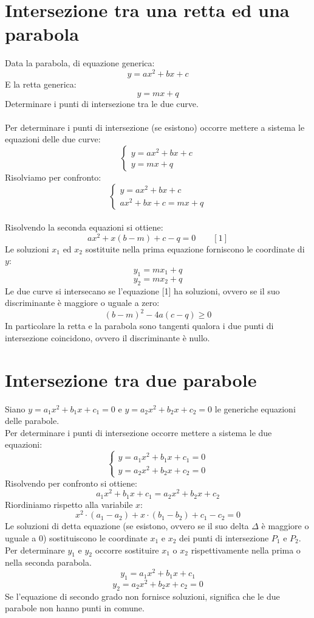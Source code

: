 \documentclass[12pt]{book}
\begin{document}
			\section{Intersezione tra una retta ed una parabola}
			Data la parabola, di equazione generica:
			\[y=ax^2+bx+c\]
			E la retta generica:
			\[y=mx+q\]
			Determinare i punti di intersezione tra le due curve.\\
			\\Per determinare i punti di intersezione (se esistono) occorre mettere a sistema le equazioni delle due curve:
			\[\begin{cases}
				y=ax^2+bx+c\\
				y=mx+q
			\end{cases}\]
			Risolviamo per confronto:
			\[\begin{cases}
				y=ax^2+bx+c\\
				ax^2+bx+c=mx+q
			\end{cases}\]
			\\Risolvendo la seconda equazioni si ottiene:
			\[ax^2+x(b-m)+c-q=0\quad\quad [1] \]
			Le soluzioni $x_1$ ed $x_2$ sostituite nella prima equazione forniscono le coordinate di $y$:
			\[y_1=mx_1+q\]
			\[y_2=mx_2+q\]
			Le due curve si intersecano se l'equazione [1] ha soluzioni, ovvero se il suo discriminante è maggiore o uguale a zero:
			\[(b-m)^2-4a(c-q)\geq0\]
			In particolare la retta e la parabola sono tangenti qualora i due punti di intersezione coincidono, ovvero il discriminante è nullo.
			
			\section{Intersezione tra due parabole}
			Siano $y=a_1x^2+b_1x+c_1=0$ e $y=a_2x^2+b_2x+c_2=0$ le generiche equazioni delle parabole.
			\\Per determinare i punti di intersezione occorre mettere a sistema le due equazioni:
				\[\begin{cases}
					y=a_1x^2+b_1x+c_1=0\\
					y=a_2x^2+b_2x+c_2=0
				\end{cases}\]
			Risolvendo per confronto si ottiene:
			\[a_1x^2+b_1x+c_1=a_2x^2+b_2x+c_2\]
			Riordiniamo rispetto alla variabile $x$:
			\[x^2\cdot \left(a_1-a_2\right)+x\cdot \left(b_1-b_2\right)+c_1-c_2=0\]
			Le soluzioni di detta equazione (se esistono, ovvero se il suo delta $\Delta$ è maggiore o uguale a 0) sostituiscono le coordinate $x_1$ e $x_2$ dei punti di intersezione $P_1$ e $P_2$. Per determinare $y_1$ e $y_2$ occorre sostituire $x_1$ o $x_2$ rispettivamente nella prima o nella seconda parabola.
			\[y_1=a_1x^2+b_1x+c_1\]  \[y_2=a_2x^2+b_2x+c_2=0\]
			Se l'equazione di secondo grado non fornisce soluzioni, significa che le due parabole non hanno punti in comune.
			
\end{document}
